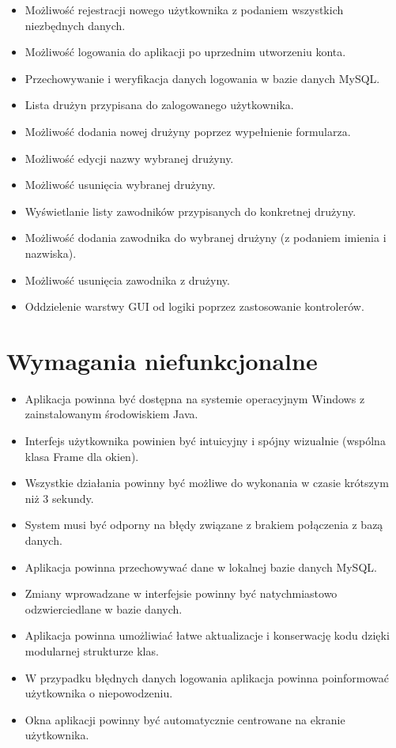 \documentclass{urdpl}     %
\begin{document}
\begin{itemize}
  \item Możliwość rejestracji nowego użytkownika z podaniem wszystkich niezbędnych danych.
  \item Możliwość logowania do aplikacji po uprzednim utworzeniu konta.
  \item Przechowywanie i weryfikacja danych logowania w bazie danych MySQL.
  \item Lista drużyn przypisana do zalogowanego użytkownika.
  \item Możliwość dodania nowej drużyny poprzez wypełnienie formularza.
  \item Możliwość edycji nazwy wybranej drużyny.
  \item Możliwość usunięcia wybranej drużyny.
  \item Wyświetlanie listy zawodników przypisanych do konkretnej drużyny.
  \item Możliwość dodania zawodnika do wybranej drużyny (z podaniem imienia i nazwiska).
  \item Możliwość usunięcia zawodnika z drużyny.
  \item Oddzielenie warstwy GUI od logiki poprzez zastosowanie kontrolerów.
\end{itemize}

\section{Wymagania niefunkcjonalne}

\begin{itemize}
  \item Aplikacja powinna być dostępna na systemie operacyjnym Windows z zainstalowanym środowiskiem Java.
  \item Interfejs użytkownika powinien być intuicyjny i spójny wizualnie (wspólna klasa Frame dla okien).
  \item Wszystkie działania powinny być możliwe do wykonania w czasie krótszym niż 3 sekundy.
  \item System musi być odporny na błędy związane z brakiem połączenia z bazą danych.
  \item Aplikacja powinna przechowywać dane w lokalnej bazie danych MySQL.
  \item Zmiany wprowadzane w interfejsie powinny być natychmiastowo odzwierciedlane w bazie danych.
  \item Aplikacja powinna umożliwiać łatwe aktualizacje i konserwację kodu dzięki modularnej strukturze klas.
  \item W przypadku błędnych danych logowania aplikacja powinna poinformować użytkownika o niepowodzeniu.
  \item Okna aplikacji powinny być automatycznie centrowane na ekranie użytkownika.
\end{itemize}
\end{document}
